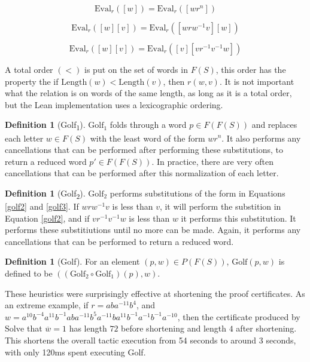 \documentclass[12pt]{article} %
\theoremstyle{definition}
\theoremstyle{definition}
\theoremstyle{definition}
\theoremstyle{definition}
\theoremstyle{definition}
\newtheorem{defn}[theorem]{Definition}
\theoremstyle{definition}
\begin{document}
\begin{equation}\label{golf1}
  \text{Eval}_r([w]) = \text{Eval}_r([wr^n])
\end{equation}

\begin{equation}\label{golf2}
  \text{Eval}_r([w][v]) = \text{Eval}_r([wrw^{-1}v][w])
\end{equation}

\begin{equation}\label{golf3}
  \text{Eval}_r([w][v]) = \text{Eval}_r([v][vr^{-1}v^{-1}w])
\end{equation}

A total order $(<)$ is put on the set of words in $F(S)$, this order has
the property the if $\text{Length}(w) < \text{Length}(v)$, then
$r(w,v)$. It is not important what the relation is on words of the same length,
as long as it is a total order, but the Lean implementation uses a lexicographic ordering.

\begin{defn}[Golf\textsubscript{1}]
$\text{Golf}_1$ folds through a word $p \in F(F(S))$ and replaces each
letter $w \in F(S)$ with the least word of the form $wr^n$.
It also performs any cancellations that can be performed after
performing these substitutions, to return a reduced word $p' \in F(F(S))$.
In practice, there are very often cancellations
that can be performed after this normalization of each letter.
\end{defn}

\begin{defn}[Golf\textsubscript{2}]
  $\text{Golf}_2$ performs substitutions of the form in Equations \ref{golf2} and
  \ref{golf3}. If $wrw^{-1}v$ is less than $v$, it will perform the substition
  in Equation \ref{golf2}, and if $vr^{-1}v^{-1}w$ is less than $w$ it performs
  this substitution. It performs these substitiutions until no more can be made.
  Again, it performs any cancellations that can be performed to return
  a reduced word.
\end{defn}

\begin{defn}[Golf]
  For an element $(p, w) \in P(F(S))$, $\text{Golf}(p, w)$ is defined to be
  $((\text{Golf}_2 \circ \text{Golf}_1)(p), w)$.
\end{defn}

These heuristics were surprisingly effective at shortening the proof certificates.
As an extreme example, if $r = aba^{-11}b^4$, and
$w = a^{10}b^{-4}a^{11}b^{-1}ab a^{-11} b^5a^{-11}b a^{11}b^{-1}a^{-1}b^{-1}a^{-10}$,
then the certificate produced by $\text{Solve}$ that $\overline{w} =1$
 has length $72$ before shortening and length $4$ after shortening.
 This shortens the overall tactic execution from 54 seconds to around
 3 seconds, with only 120ms spent executing Golf.
\end{document}
